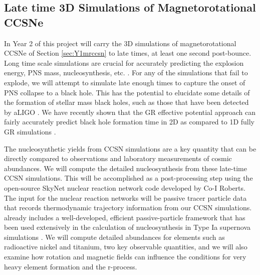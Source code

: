 %


\vspace{0.1in} 

\subsection{Late time 3D Simulations of Magnetorotational CCSNe}
\label{sec:Y2late}

In Year 2 of this project will carry the 3D simulations of magnetorotational CCSNe of Section \ref{sec:Y1mrccsn} to late times, at least one second post-bounce.
Long time scale simulations are crucial for accurately predicting the explosion energy, PNS mass, nucleosynthesis, etc. \citep{Bruenn:2016, Muller:2017}.
For any of the simulations that fail to explode, we will attempt to simulate late enough times to capture the onset of PNS collapse to a black hole.
This has the potential to elucidate some details of the formation of stellar mass black holes, such as those that have been detected by aLIGO \citep{Abbott:2016, Abbott:2017}.
We have recently shown \citep{Pan:2017} that the GR effective potential approach can fairly accurately predict black hole formation time in 2D as compared to 1D fully GR simulations \citep{OConnor:2011}.

The nucleosynthetic yields from CCSN simulations are a key quantity that can be directly compared to observations and laboratory measurements of cosmic abundances.
We will compute the detailed nucleosynthesis from these late-time CCSN simulations.
This will be accomplished as a post-processing step using the open-source SkyNet nuclear reaction network code developed by Co-I Roberts.
The input for the nuclear reaction networks will be passive tracer particle data that records thermodynamic trajectory information from our \flash CCSN simulations.
\flash already includes a well-developed, efficient passive-particle framework that has been used extensively in the calculation of nucleosynthesis in Type Ia supernova simulations \citep[e.g.,][]{Long:2014}.
We will compute detailed abundances for elements such as radioactive nickel and titanium, two key observable quantities, and we will also examine how rotation and magnetic fields can influence the conditions for very heavy element formation and the r-process.

